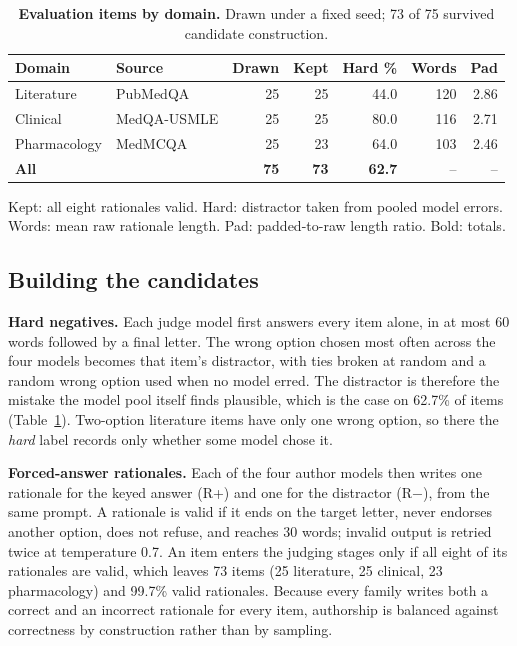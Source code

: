 \documentclass[conference]{IEEEtran}
\begin{document}
\begin{table}[t]
\centering
\footnotesize
\caption{\textbf{Evaluation items by domain.} Drawn under a fixed seed; 73 of 75 survived candidate construction.}
\label{tab:evaluation-items}
\setlength{\tabcolsep}{3.5pt}
\begin{threeparttable}
\begin{tabular}{@{}llrrrrr@{}}
\toprule
\textbf{Domain} & \textbf{Source} & \textbf{Drawn} & \textbf{Kept} & \textbf{Hard \%} & \textbf{Words} & \textbf{Pad} \\
\midrule
Literature & PubMedQA & 25 & 25 & 44.0 & 120 & 2.86 \\
Clinical & MedQA-USMLE & 25 & 25 & 80.0 & 116 & 2.71 \\
Pharmacology & MedMCQA & 25 & 23 & 64.0 & 103 & 2.46 \\
\midrule
\textbf{All} & & \textbf{75} & \textbf{73} & \textbf{62.7} & -- & -- \\
\bottomrule
\end{tabular}
\begin{tablenotes}[flushleft]
\scriptsize\raggedright
\item Kept: all eight rationales valid. Hard: distractor taken from pooled model errors. Words: mean raw rationale length. Pad: padded-to-raw length ratio. Bold: totals.
\end{tablenotes}
\end{threeparttable}
\end{table}

\subsection{Building the candidates}
\textbf{Hard negatives.} Each judge model first answers every item alone, in at most 60 words followed by a final letter. The wrong option chosen most often across the four models becomes that item's distractor, with ties broken at random and a random wrong option used when no model erred. The distractor is therefore the mistake the model pool itself finds plausible, which is the case on 62.7\% of items (Table~\ref{tab:evaluation-items}). Two-option literature items have only one wrong option, so there the \emph{hard} label records only whether some model chose it.

\textbf{Forced-answer rationales.} Each of the four author models then writes one rationale for the keyed answer (R+) and one for the distractor (R$-$), from the same prompt. A rationale is valid if it ends on the target letter, never endorses another option, does not refuse, and reaches 30 words; invalid output is retried twice at temperature 0.7. An item enters the judging stages only if all eight of its rationales are valid, which leaves 73 items (25 literature, 25 clinical, 23 pharmacology) and 99.7\% valid rationales. Because every family writes both a correct and an incorrect rationale for every item, authorship is balanced against correctness by construction rather than by sampling.
\end{document}
